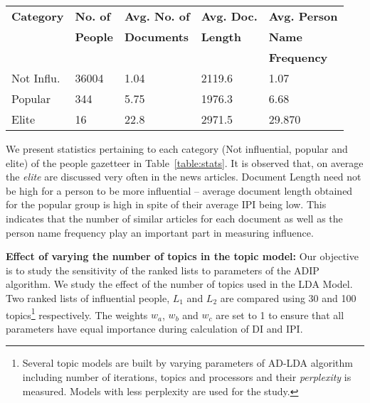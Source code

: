 
\begin{table*}
\caption {Table illustrating average statistics for each Person Category of the People Gazetteer.}
\label{table:stats}
\resizebox{8cm}{!} {
\centering

    \begin{tabular}{|lllll|}
    \hline
    \textbf{Category}  &  \textbf{No. of }   & \textbf{Avg. No. of }   &  \textbf{Avg. Doc. }	&  \textbf{Avg. Person }	\\  
    & \textbf{People} & \textbf{Documents} & \textbf{Length} &  \textbf{Name } \\
    & & & & \textbf{Frequency} \\  \hline
Not Influ. & 36004 & 1.04 & 2119.6 & 1.07 	\\ \hline
 Popular & 344 & 5.75 & 1976.3 & 6.68  \\ \hline
Elite & 16 & 22.8 & 2971.5 & 29.870	 \\	\hline 
  \end{tabular}}
\end{table*}

We present statistics pertaining to each category (Not influential, popular and elite) of the people gazetteer in Table~\ref{table:stats}. 
It is observed that, on average the \emph{elite} are discussed very often in the news articles.
Document Length need not be high for a person to be more influential -- average document length obtained for the popular group is high in spite of their average IPI being low. This indicates that the number of similar articles for each document as well as the person name frequency play an important part in measuring influence.

\noindent \textbf{Effect of varying the number of topics in the topic model: } Our objective is to study the sensitivity of the ranked lists to parameters of the ADIP algorithm. We study the effect of the number of topics used in the LDA Model.  
Two ranked lists of influential people, $L_1$ and $L_2$ are compared using 30 and 100 topics\footnote{Several topic models are built by varying parameters of AD-LDA algorithm including number of iterations, topics and processors and their \emph{perplexity} is measured. Models with less perplexity are used for the study.} respectively. The weights $w_a$, $w_b$ and $w_c$ are set to 1 to ensure that all parameters have equal importance during calculation of DI and IPI. 

